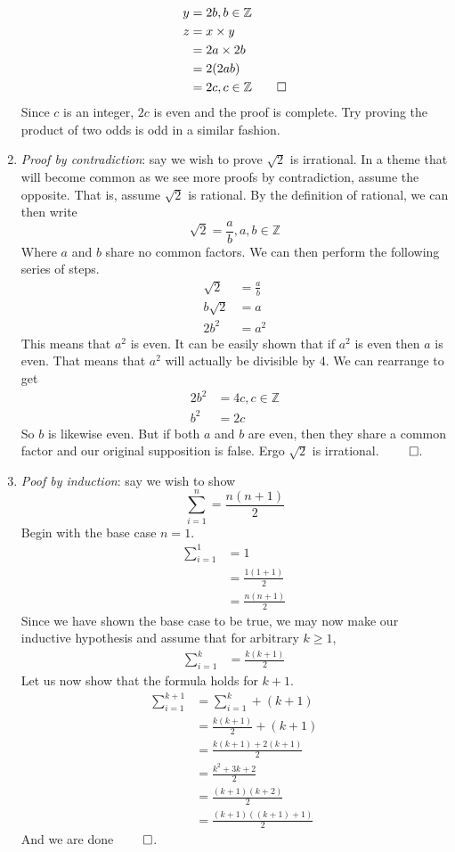 \documentclass[nobib]{tufte-handout}
\begin{document}
\begin{enumerate}
\begin{align*}
        y &= 2b, b \in \mathbb{Z} \\
        z &= x \times y \\
        &= 2a\times 2b \\
        &= 2(2ab) \\
        &= 2c, c \in \mathbb{Z} \qed
    \end{align*}
    Since $c$ is an integer, $2c$ is even and the proof is complete. Try proving 
    the product of two odds is odd in a similar fashion. 
    \item \emph{Proof by contradiction}: say we wish to prove $\sqrt{2}$ is irrational. In a theme
    that will become common as we see more proofs by contradiction, 
    assume the opposite. That is, assume $\sqrt{2}$ is rational. By
    the definition of rational, we can then write 
    \[\sqrt{2} = \frac{a}{b}, a,b \in \mathbb{Z}\]
    Where $a$ and $b$ share no common factors. 
    We can then perform the following series of steps. 
    \begin{align*}
        \sqrt{2} &= \frac{a}{b} \\
        b\sqrt{2} &= a \\
        2b^2 &= a^2
    \end{align*}
    This means that $a^2$ is even. It can be easily shown 
    that if $a^2$ is even then $a$ is even. That means that 
    $a^2$ will actually be divisible by 4. We can rearrange to get
    \begin{align*}
        2b^2 &= 4c, c \in \mathbb{Z} \\
        b^2 &= 2c
    \end{align*}
    So $b$ is likewise even. But if both $a$ and $b$ are even, 
    then they share a common factor and our original supposition is false. 
    Ergo $\sqrt{2}$ is irrational. $\qed$. 
    \item \emph{Poof by induction}: say we wish to show 
    \[\sum_{i = 1}^{n} = \frac{n(n+1)}{2}\]
    Begin with the base case $n=1$. 
    \begin{align*}
        \sum_{i = 1}^{1} &= 1 \\
        &= \frac{1(1+1)}{2} \\
        &= \frac{n(n+1)}{2}
    \end{align*}
    Since we have shown the base case to be true, 
    we may now make our inductive hypothesis and assume that for
    arbitrary $k \geq 1$, 
    \begin{align*}
        \sum_{i = 1}^{k} &= \frac{k(k+1)}{2}
    \end{align*}
    Let us now show that the formula holds for $k + 1$. 
    \begin{align*}
        \sum_{i = 1}^{k + 1} &= \sum_{i = 1}^{k} + (k + 1)\\
        &= \frac{k(k+1)}{2} + (k + 1) \\
        &= \frac{k(k+1) + 2(k+1)}{2}\\
        &= \frac{k^2+3k+2}{2}\\
        &= \frac{(k + 1)(k + 2)}{2} \\
        &= \frac{(k + 1)((k+1) + 1)}{2} 
    \end{align*}
    And we are done $\qed$. 
\end{enumerate}
\end{document}
